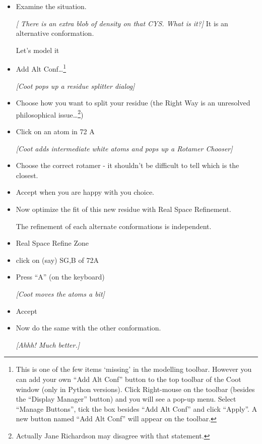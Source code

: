 \documentclass{article}
\begin{document}
\begin{itemize}
\item Examine the situation.

\emph{[ There is an extra blob of density on that CYS.  What is it?]}
It is an alternative conformation.

Let's model it

\item \textsf{Add Alt Conf\ldots\footnote{This is one of the few items 
  `missing' in the modelling toolbar. However you can add your own ``Add 
  Alt Conf'' button to the top toolbar of the Coot window (only in Python 
  versions). Click Right-mouse on the toolbar (besides the ``Display Manager'' 
  button) and you will see a pop-up menu. Select ``Manage Buttons'',  
  tick the box besides ``Add Alt Conf'' and click ``Apply''. A new button 
  named ``Add Alt Conf'' will appear on the toolbar.}}

\textsl{  [Coot pops up a residue splitter dialog]}

\item Choose how you want to split your residue (the Right Way is an
  unresolved philosophical issue\ldots\footnote{Actually Jane Richardson may disagree with that statement.})

\item Click on an atom in 72 A
  
  \textsl{ [Coot adds intermediate white atoms and pops up a Rotamer
    Chooser]}
  
\item Choose the correct rotamer - it shouldn't be difficult to tell
  which is the closest.

\item \textsf{Accept} when you are happy with you choice.
  
\item Now optimize the fit of this new residue with Real Space
  Refinement.

The refinement of each alternate conformations is independent.

\item \textsf{Real Space Refine Zone}

\item click on (say) SG,B of 72A

\item Press ``A'' (on the keyboard)

  \textsl{ [Coot moves the atoms a bit]}

\item \textsf{Accept}

\item Now do the same with the other conformation.

   \emph{  [Ahhh!  Much better.]}

\end{itemize}
\end{document}
